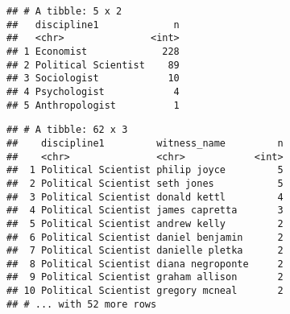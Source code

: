 \documentclass[]{article}
\newenvironment{Shaded}{\begin{snugshade}}{\end{snugshade}}
\newcommand{\KeywordTok}[1]{\textcolor[rgb]{0.13,0.29,0.53}{\textbf{#1}}}
\newcommand{\NormalTok}[1]{#1}
\newcommand{\OperatorTok}[1]{\textcolor[rgb]{0.81,0.36,0.00}{\textbf{#1}}}
\newcommand{\StringTok}[1]{\textcolor[rgb]{0.31,0.60,0.02}{#1}}
\begin{document}
\begin{Shaded}
\end{Shaded}

\begin{verbatim}
## # A tibble: 5 x 2
##   discipline1             n
##   <chr>               <int>
## 1 Economist             228
## 2 Political Scientist    89
## 3 Sociologist            10
## 4 Psychologist            4
## 5 Anthropologist          1
\end{verbatim}

\begin{Shaded}
\end{Shaded}

\begin{verbatim}
## # A tibble: 62 x 3
##    discipline1         witness_name         n
##    <chr>               <chr>            <int>
##  1 Political Scientist philip joyce         5
##  2 Political Scientist seth jones           5
##  3 Political Scientist donald kettl         4
##  4 Political Scientist james capretta       3
##  5 Political Scientist andrew kelly         2
##  6 Political Scientist daniel benjamin      2
##  7 Political Scientist danielle pletka      2
##  8 Political Scientist diana negroponte     2
##  9 Political Scientist graham allison       2
## 10 Political Scientist gregory mcneal       2
## # ... with 52 more rows
\end{verbatim}

\begin{Shaded}
\end{Shaded}
\end{document}
